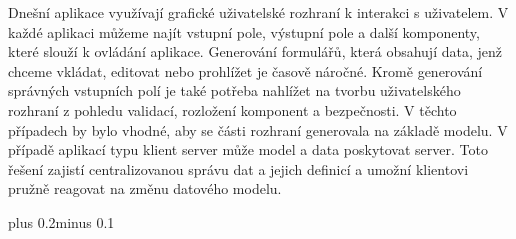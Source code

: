 \documentclass[11pt,twoside,a4paper]{book}
\begin{document}



 
\abstractpage




\baselineskip

\noindent
Dnešní aplikace využívají grafické uživatelské rozhraní k interakci s uživatelem. V každé aplikaci můžeme najít vstupní pole, výstupní pole a další komponenty, které slouží k ovládání aplikace. Generování formulářů, která obsahují data, jenž chceme vkládat, editovat nebo prohlížet je časově náročné. Kromě generování správných vstupních polí je také potřeba nahlížet na tvorbu uživatelského rozhraní z pohledu validací, rozložení komponent a bezpečnosti. V těchto případech by bylo vhodné, aby se části rozhraní generovala na základě modelu. V případě aplikací typu klient server může model a data poskytovat server. Toto řešení zajistí centralizovanou správu dat a jejich definicí a umožní klientovi pružně reagovat na změnu datového modelu.


\tableofcontents



\listoffigures



\listoftables
\renewcommand\lstlistingname{Část zdrojového kódu}
\renewcommand\lstlistlistingname{Seznam částí zdrojových kódů}
\lstlistoflistings



\mainbodystarts
\normalfont
{}\baselineskip plus 0.2\baselineskip minus 0.1\baselineskip

\end{document}
